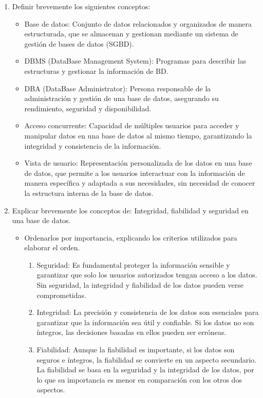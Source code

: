 \begin{enumerate}
    \item Definir brevemente los siguientes conceptos:
    \begin{itemize}
        \item Base de datos: Conjunto de datos relacionados y organizados de manera estructurada, que se almacenan y gestionan mediante un sistema de gestión de bases de datos (SGBD).
        \item DBMS (DataBase Management System): Programas para describir las estructuras y gestionar la información de BD.
        \item DBA (DataBase Administrator): Persona responsable de la administración y gestión de una base de datos, asegurando su rendimiento, seguridad y disponibilidad.
        \item Acceso concurrente: Capacidad de múltiples usuarios para acceder y manipular datos en una base de datos al mismo tiempo, garantizando la integridad y consistencia de la información.
        \item Vista de usuario: Representación personalizada de los datos en una base de datos, que permite a los usuarios interactuar con la información de manera específica y adaptada a sus necesidades, sin necesidad de conocer la estructura interna de la base de datos.
    \end{itemize}
    \item Explicar brevemente los conceptos de: Integridad, fiabilidad y seguridad en una base de datos.
        \begin{itemize}
            \item Ordenarlos por importancia, explicando los criterios utilizados para elaborar el orden.
            
            \begin{enumerate}
                \item Seguridad: Es fundamental proteger la información sensible y garantizar que solo los usuarios autorizados tengan acceso a los datos. Sin seguridad, la integridad y fiabilidad de los datos pueden verse comprometidas.
                \item Integridad: La precisión y consistencia de los datos son esenciales para garantizar que la información sea útil y confiable. Si los datos no son íntegros, las decisiones basadas en ellos pueden ser erróneas.
                \item Fiabilidad: Aunque la fiabilidad es importante, si los datos son seguros e íntegros, la fiabilidad se convierte en un aspecto secundario. La fiabilidad se basa en la seguridad y la integridad de los datos, por lo que su importancia es menor en comparación con los otros dos aspectos.
            \end{enumerate}


\end{itemize}
\end{enumerate}
